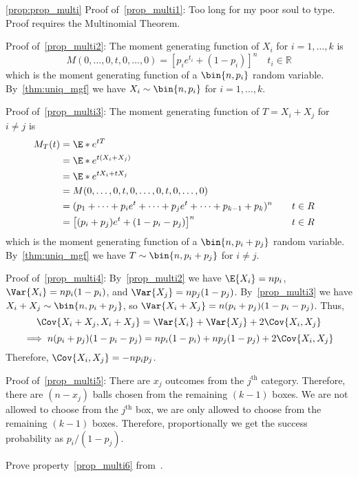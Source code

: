 \begin{Proof}{\ref{prop:prop_multi}}{}
    Proof of~\ref{prop_multi1}: Too long
    for my poor soul to type. Proof requires the Multinomial Theorem.

    Proof of~\ref{prop_multi2}: The moment
    generating function of $ X_i $ for $ i=1,\ldots,k $ is
    \[ M(0,\ldots,0,t,0,\ldots,0)=\left[ p_i e^{t_i}+(1-p_i) \right]^n
        \quad t_i\in\mathbb{R} \]
    which is the moment generating function of a
    $ \bin{n,p_i} $ random variable. By~\ref{thm:uniq_mgf}
    we have $ X_i \sim \bin{n,p_i} $ for $ i=1,\ldots,k $.

    Proof of~\ref{prop_multi3}: The moment
    generating function of $ T=X_i+X_j $ for $ i\neq j $ is
    \begin{align*}
        M_T(t)
         & =\E*{e^{tT}}                                                                         \\
         & =\E*{e^{t(X_i+X_j)}}                                                                 \\
         & =\E*{e^{t X_i+t X_j}}                                                                \\
         & =M(0,\ldots,0,t,0,\ldots,0,t,0,\ldots,0)                                             \\
         & =(p_1+\cdots+p_i e^{t}+\cdots+p_j e^t+\cdots+p_{k-1}+p_k)^n & \quad & t\in\mathbb{R} \\
         & =\left[ (p_i+p_j)e^t+(1-p_i-p_j) \right]^n                  &       & t\in\mathbb{R}
    \end{align*}
    which is the moment generating function of a
    $ \bin{n,p_i+p_j} $ random variable. By~\ref{thm:uniq_mgf}
    we have $ T \sim \bin{n,p_i+p_j} $ for $ i\neq j $.

    Proof of~\ref{prop_multi4}:
    By~\ref{prop_multi2} we have $ \E{X_i}=n p_i $, $ \Var{X_i}=np_i(1-p_i) $,
    and $ \Var{X_j}=np_j(1-p_j) $. By~\ref{prop_multi3} we have
    $ X_i+X_j \sim \bin{n,p_i+p_j} $, so
    $ \Var{X_i+X_j}=n(p_i+p_j)(1-p_i-p_j) $.
    Thus,
    \[ \Cov{X_i+X_j,X_i+X_j}=\Var{X_i}+\Var{X_j}+2\Cov{X_i,X_j} \]
    \[ \implies n(p_i+p_j)(1-p_i-p_j)=np_i(1-p_i)+np_j(1-p_j)
        +2\Cov{X_i,X_j} \]
    Therefore, $ \Cov{X_i,X_j}=-n p_i p_j $.

    Proof of~\ref{prop_multi5}: There are $ x_j $ outcomes
    from the $ j^{\text{th}} $ category. Therefore,
    there are $ (n-x_j) $ balls chosen from the remaining $ (k-1) $
    boxes. We are not allowed to choose from the $ j^{\text{th}} $ box,
    we are only allowed to choose from the remaining $ (k-1) $
    boxes. Therefore, proportionally we get the success probability
    as $ p_i/(1-p_j) $.
\end{Proof}
\begin{Exercise}{}{}
    Prove property~\ref{prop_multi6} from~.
\end{Exercise}
